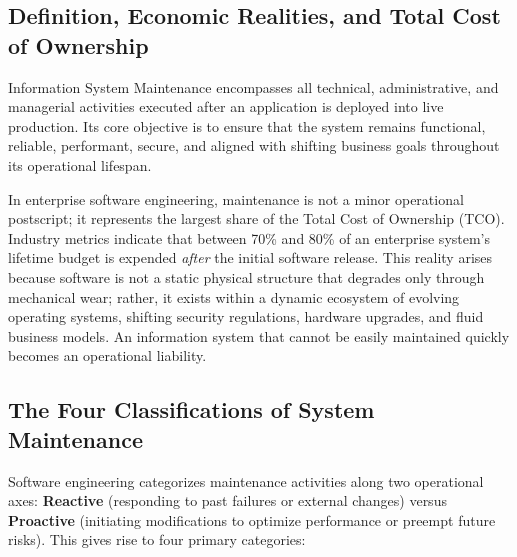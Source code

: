 \documentclass[11pt,a4paper]{article}
\begin{document}
\subsection{Definition, Economic Realities, and Total Cost of Ownership}
Information System Maintenance encompasses all technical, administrative, and managerial activities executed after an application is deployed into live production. Its core objective is to ensure that the system remains functional, reliable, performant, secure, and aligned with shifting business goals throughout its operational lifespan.

In enterprise software engineering, maintenance is not a minor operational postscript; it represents the largest share of the Total Cost of Ownership (TCO). Industry metrics indicate that between 70\% and 80\% of an enterprise system's lifetime budget is expended \textit{after} the initial software release. This reality arises because software is not a static physical structure that degrades only through mechanical wear; rather, it exists within a dynamic ecosystem of evolving operating systems, shifting security regulations, hardware upgrades, and fluid business models. An information system that cannot be easily maintained quickly becomes an operational liability.

\subsection{The Four Classifications of System Maintenance}
Software engineering categorizes maintenance activities along two operational axes: \textbf{Reactive} (responding to past failures or external changes) versus \textbf{Proactive} (initiating modifications to optimize performance or preempt future risks). This gives rise to four primary categories:
\end{document}
